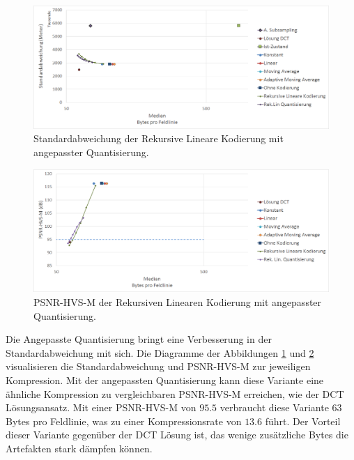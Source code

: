 \begin{figure}[!htbp]
	\center
	\includegraphics[width=1\textwidth,keepaspectratio]{./pictures/resultate/loesung2/variante3/resultate.png}
		
		\caption{Standardabweichung der Rekursive Lineare Kodierung mit angepasster Quantisierung.}
		\label{resultate:loesung2:adaptive:median:quant}
\end{figure}
\begin{figure}[!htbp]
\center
	\includegraphics[width=1\textwidth,keepaspectratio]{./pictures/resultate/loesung2/variante3/resultate_psnr.png}
	
	\caption{PSNR-HVS-M der Rekursiven Linearen Kodierung mit angepasster Quantisierung.}
	\label{resultate:loesung2:adaptive:median:quant_psnr}
\end{figure}
Die Angepasste Quantisierung bringt eine Verbesserung in der Standardabweichung mit sich. Die Diagramme der Abbildungen \ref{resultate:loesung2:adaptive:median:quant} und \ref{resultate:loesung2:adaptive:median:quant_psnr} visualisieren die Standardabweichung und PSNR-HVS-M zur jeweiligen Kompression. Mit der angepassten Quantisierung kann diese Variante eine ähnliche Kompression zu vergleichbaren PSNR-HVS-M erreichen, wie der DCT Lösungsansatz. Mit einer PSNR-HVS-M von $95.5$ verbraucht diese Variante $63$ Bytes pro Feldlinie, was zu einer Kompressionsrate von $13.6$ führt. Der Vorteil dieser Variante gegenüber der DCT Lösung ist, das wenige zusätzliche Bytes die Artefakten stark dämpfen können. 

